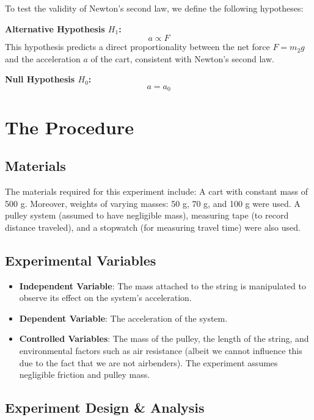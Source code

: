 \documentclass{article}
\begin{document}
To test the validity of Newton’s second law, we define the following hypotheses:

\textbf{Alternative Hypothesis \( H_1 \):}
\begin{equation}
    a \propto F
\end{equation}
This hypothesis predicts a direct proportionality between the net force \( F = m_2 g \) and the acceleration \( a \) of the cart, consistent with Newton’s second law.

\textbf{Null Hypothesis \( H_0 \):}
\begin{equation}
    a = a_0
\end{equation}

\section{The Procedure}

\subsection{Materials}
The materials required for this experiment include:
A cart with constant mass of 500 g. Moreover, weights of varying masses: 50 g, 70 g, and 100 g were used. A pulley system (assumed to have negligible mass), measuring tape (to record distance traveled), and a stopwatch (for measuring travel time) were also used.


\subsection{Experimental Variables}
\begin{itemize}
    \item \textbf{Independent Variable}: The mass attached to the string is manipulated to observe its effect on the system's acceleration.
    \item \textbf{Dependent Variable}: The acceleration of the system.
    \item \textbf{Controlled Variables}: The mass of the pulley, the length of the string, and environmental factors such as air resistance (albeit we cannot influence this due to the fact that we are not airbenders). The experiment assumes negligible friction and pulley mass.
\end{itemize}

\subsection{Experiment Design \& Analysis}
\end{document}
